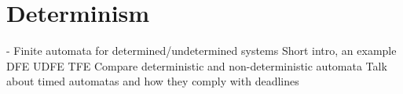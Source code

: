 \section{Determinism} \label{sc:determinism}

- Finite automata for determined/undetermined systems
Short intro, an example
DFE
UDFE
TFE
Compare deterministic and non-deterministic automata
Talk about timed automatas and how they comply with deadlines
